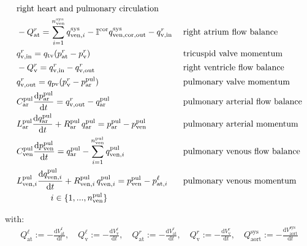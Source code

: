 \documentclass[a4paper,12pt]{report}
\begin{document}
\begin{alignat}{2}
&\text{right heart and pulmonary circulation} && \nonumber\\
&-Q_{\mathrm{at}}^{r} = \sum\limits_{i=1}^{n_{\mathrm{ven}}^{\mathrm{sys}}}q_{\mathrm{ven},i}^{\mathrm{sys}} - \mathbb{I}^{\mathrm{cor}} q_{\mathrm{ven,cor,out}}^{\mathrm{sys}} - q_{\mathrm{v,in}}^{r} && \text{\;right atrium flow balance}\nonumber\\
&q_{\mathrm{v,in}}^{r} = q_{\mathrm{tv}}(p_{\mathrm{at}}^{r}-p_{\mathrm{v}}^{r}) && \text{\;tricuspid valve momentum}\label{eq:tv_flow}\\
&-Q_{\mathrm{v}}^{r} = q_{\mathrm{v,in}}^{r} - q_{\mathrm{v,out}}^{r} && \text{\;right ventricle flow balance}\nonumber\\
&q_{\mathrm{v,out}}^{r} = q_{\mathrm{pv}}(p_{\mathrm{v}}^{r}-p_{\mathrm{ar}}^{\mathrm{pul}}) && \text{\;pulmonary valve momentum}\label{eq:pv_flow}\\
&C_{\mathrm{ar}}^{\mathrm{pul}} \frac{\mathrm{d}p_{\mathrm{ar}}^{\mathrm{pul}}}{\mathrm{d}t} = q_{\mathrm{v,out}}^{r} - q_{\mathrm{ar}}^{\mathrm{pul}} && \text{\;pulmonary arterial flow balance}\nonumber\\
&L_{\mathrm{ar}}^{\mathrm{pul}} \frac{\mathrm{d}q_{\mathrm{ar}}^{\mathrm{pul}}}{\mathrm{d}t} + R_{\mathrm{ar}}^{\mathrm{pul}}\,q_{\mathrm{ar}}^{\mathrm{pul}}=p_{\mathrm{ar}}^{\mathrm{pul}} -p_{\mathrm{ven}}^{\mathrm{pul}} && \text{\;pulmonary arterial momentum}\nonumber\\
&C_{\mathrm{ven}}^{\mathrm{pul}} \frac{\mathrm{d}p_{\mathrm{ven}}^{\mathrm{pul}}}{\mathrm{d}t} = q_{\mathrm{ar}}^{\mathrm{pul}} - \sum\limits_{i=1}^{n_{\mathrm{ven}}^{\mathrm{pul}}}q_{\mathrm{ven},i}^{\mathrm{pul}} && \text{\;pulmonary venous flow balance}\nonumber\\
&L_{\mathrm{ven},i}^{\mathrm{pul}} \frac{\mathrm{d}q_{\mathrm{ven},i}^{\mathrm{pul}}}{\mathrm{d}t} + R_{\mathrm{ven},i}^{\mathrm{pul}}\, q_{\mathrm{ven},i}^{\mathrm{pul}}=p_{\mathrm{ven}}^{\mathrm{pul}}-p_{\mathrm{at},i}^{\ell} && \text{\;pulmonary venous momentum}\nonumber\\
&\qquad\qquad i \in \{1,...,n_{\mathrm{ven}}^{\mathrm{pul}}\} && \nonumber
\end{alignat}

with:
\begin{align}
Q_{\mathrm{at}}^{\ell} := -\frac{\mathrm{d}V_{\mathrm{at}}^{\ell}}{\mathrm{d}t}, \quad
Q_{\mathrm{v}}^{\ell} := -\frac{\mathrm{d}V_{\mathrm{v}}^{\ell}}{\mathrm{d}t}, \quad
Q_{\mathrm{at}}^{r} := -\frac{\mathrm{d}V_{\mathrm{at}}^{r}}{\mathrm{d}t}, \quad
Q_{\mathrm{v}}^{r} := -\frac{\mathrm{d}V_{\mathrm{v}}^{r}}{\mathrm{d}t},
\quad
Q_{\mathrm{aort}}^{\mathrm{sys}} := -\frac{\mathrm{d}V_{\mathrm{aort}}^{\mathrm{sys}}}{\mathrm{d}t}\nonumber
\end{align}
\end{document}

